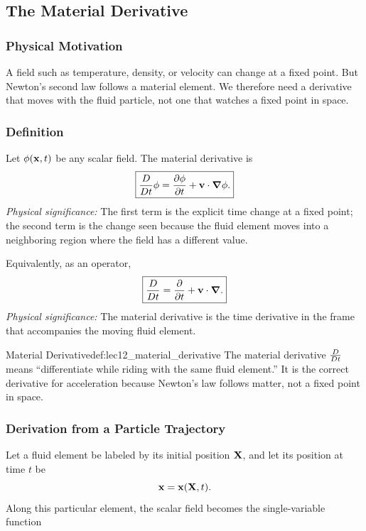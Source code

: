 \documentclass[../main.tex]{subfiles}
\begin{document}
\subsection{The Material Derivative}\label{sec:lec12:material-derivative}

\subsubsection*{Physical Motivation}
A field such as temperature, density, or velocity can change at a fixed point. But Newton's second law follows a material element. We therefore need a derivative that moves with the fluid particle, not one that watches a fixed point in space.

\subsubsection{Definition}\label{subsec:lec12:material-definition}
Let $\phi(\mathbf{x},t)$ be any scalar field. The material derivative is
\begin{equation}
  \boxed{
  \frac{D}{Dt} \phi
  =
  \pdv{\phi}{t}
  +
  \mathbf{v}\cdot\grad\phi.}
  \label{eq:lec12_material_derivative_scalar}
\end{equation}
\textit{Physical significance:} The first term is the explicit time change at a fixed point; the second term is the change seen because the fluid element moves into a neighboring region where the field has a different value.

Equivalently, as an operator,
\begin{equation}
  \boxed{\frac{D}{Dt}=\pdv{}{t}+\mathbf{v}\cdot\grad.}
  \label{eq:lec12_material_derivative_operator}
\end{equation}
\textit{Physical significance:} The material derivative is the time derivative in the frame that accompanies the moving fluid element.

\begin{Definition}{Material Derivative}{def:lec12_material_derivative}
The material derivative $\frac{D}{Dt}$ means ``differentiate while riding with the same fluid element.'' It is the correct derivative for acceleration because Newton's law follows matter, not a fixed point in space.
\end{Definition}

\subsubsection{Derivation from a Particle Trajectory}\label{subsec:lec12:material-trajectory}
Let a fluid element be labeled by its initial position $\mathbf{X}$, and let its position at time $t$ be
\begin{equation}
  \mathbf{x}=\mathbf{x}(\mathbf{X},t).
  \label{eq:lec12_lagrangian_map}
\end{equation}
Along this particular element, the scalar field becomes the single-variable function
\end{document}
